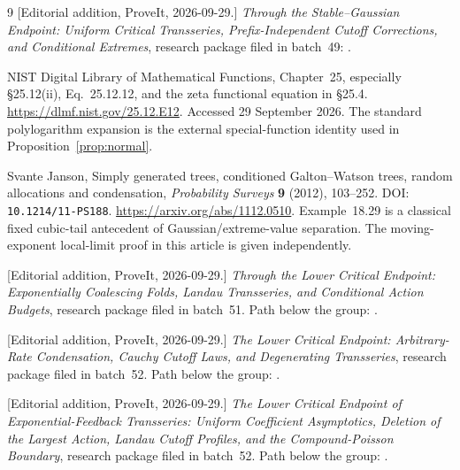 \documentclass[11pt,a4paper]{article}
\numberwithin{equation}{section}
\theoremstyle{definition}
\theoremstyle{remark}
\begin{document}
\begin{thebibliography}{9}
[Editorial addition, ProveIt, 2026-09-29.]
\emph{Through the Stable--Gaussian Endpoint: Uniform Critical Transseries,
Prefix-Independent Cutoff Corrections, and Conditional Extremes}, research
package filed in batch~49:
.

NIST Digital Library of Mathematical Functions, Chapter~25, especially
\S25.12(ii), Eq.~25.12.12, and the zeta functional equation in \S25.4.
\url{https://dlmf.nist.gov/25.12.E12}.
Accessed 29 September 2026. The standard polylogarithm expansion is the
external special-function identity used in Proposition~\ref{prop:normal}.

Svante Janson, Simply generated trees, conditioned Galton--Watson trees,
random allocations and condensation, \emph{Probability Surveys} \textbf{9}
(2012), 103--252. DOI: \texttt{10.1214/11-PS188}.
\url{https://arxiv.org/abs/1112.0510}.
Example~18.29 is a classical fixed cubic-tail antecedent of
Gaussian/extreme-value separation. The moving-exponent local-limit proof in
this article is given independently.

[Editorial addition, ProveIt, 2026-09-29.]
\emph{Through the Lower Critical Endpoint: Exponentially Coalescing Folds,
Landau Transseries, and Conditional Action Budgets}, research package filed
in batch~51. Path below the group:
.

[Editorial addition, ProveIt, 2026-09-29.]
\emph{The Lower Critical Endpoint: Arbitrary-Rate Condensation, Cauchy
Cutoff Laws, and Degenerating Transseries}, research package filed in
batch~52. Path below the group:
.

[Editorial addition, ProveIt, 2026-09-29.]
\emph{The Lower Critical Endpoint of Exponential-Feedback Transseries:
Uniform Coefficient Asymptotics, Deletion of the Largest Action, Landau
Cutoff Profiles, and the Compound-Poisson Boundary}, research package filed
in batch~52. Path below the group:
.

\end{thebibliography}
\end{document}
